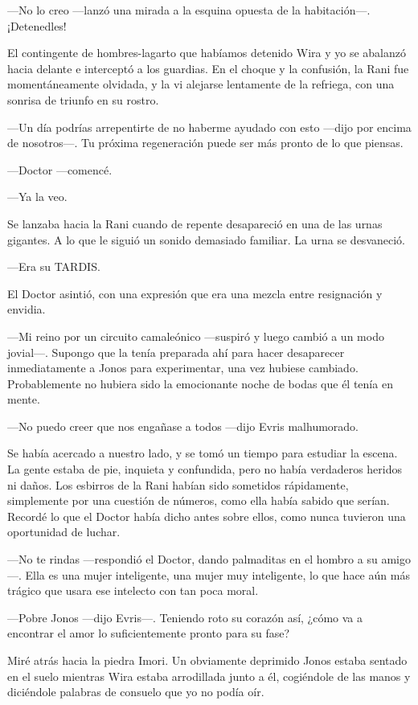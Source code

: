 ---No lo creo ---lanzó una mirada a la esquina opuesta de la
habitación---. ¡Detenedles!

El contingente de hombres-lagarto que habíamos detenido Wira y yo se
abalanzó hacia delante e interceptó a los guardias. En el choque y la
confusión, la Rani fue momentáneamente olvidada, y la vi alejarse
lentamente de la refriega, con una sonrisa de triunfo en su rostro.

---Un día podrías arrepentirte de no haberme ayudado con esto ---dijo
por encima de nosotros---. Tu próxima regeneración puede ser más pronto
de lo que piensas.

---Doctor ---comencé.

---Ya la veo.

Se lanzaba hacia la Rani cuando de repente desapareció en una de las
urnas gigantes. A lo que le siguió un sonido demasiado familiar. La urna
se desvaneció.

---Era su TARDIS.

El Doctor asintió, con una expresión que era una mezcla entre
resignación y envidia.

---Mi reino por un circuito camaleónico ---suspiró y luego cambió a un
modo jovial---. Supongo que la tenía preparada ahí para hacer
desaparecer inmediatamente a Jonos para experimentar, una vez hubiese
cambiado. Probablemente no hubiera sido la emocionante noche de bodas
que él tenía en mente.

---No puedo creer que nos engañase a todos ---dijo Evris malhumorado.

Se había acercado a nuestro lado, y se tomó un tiempo para estudiar la
escena. La gente estaba de pie, inquieta y confundida, pero no había
verdaderos heridos ni daños. Los esbirros de la Rani habían sido
sometidos rápidamente, simplemente por una cuestión de números, como
ella había sabido que serían. Recordé lo que el Doctor había dicho antes
sobre ellos, como nunca tuvieron una oportunidad de luchar.

---No te rindas ---respondió el Doctor, dando palmaditas en el hombro a
su amigo---. Ella es una mujer inteligente, una mujer muy inteligente,
lo que hace aún más trágico que usara ese intelecto con tan poca moral.

---Pobre Jonos ---dijo Evris---. Teniendo roto su corazón así, ¿cómo va
a encontrar el amor lo suficientemente pronto para su fase?

Miré atrás hacia la piedra Imori. Un obviamente deprimido Jonos estaba
sentado en el suelo mientras Wira estaba arrodillada junto a él,
cogiéndole de las manos y diciéndole palabras de consuelo que yo no
podía oír.

